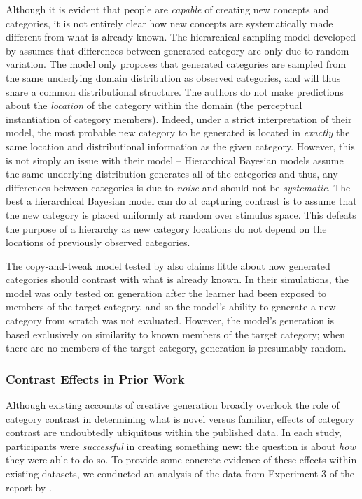 \documentclass[12pt]{article}
\begin{document}
\begin{flushleft}
Although it is evident that people are \textit{capable} of creating new concepts and categories, it is not entirely clear how new concepts are systematically made different from what is already known. The hierarchical sampling model developed by \cite{jern2013probabilistic} assumes that differences between generated category are only due to random variation. The model only proposes that generated categories are sampled from the same underlying domain distribution as observed categories, and will thus share a common distributional structure. The authors do not make predictions about the \textit{location} of the category within the domain (the perceptual instantiation of category members). Indeed, under a strict interpretation of their model, the most probable new category to be generated is located in {\em exactly} the same location and distributional information as the given category. However, this is not simply an issue with their model -- Hierarchical Bayesian models assume the same underlying distribution generates all of the categories and thus, any differences between categories is due to {\em noise} and should not be {\em systematic}. The best a hierarchical Bayesian model can do at capturing contrast is to assume that the new category is placed uniformly at random over stimulus space. This defeats the purpose of a hierarchy as new category locations do not depend on the locations of previously observed categories.

The copy-and-tweak model tested by \cite{jern2013probabilistic} also claims little about how generated categories should contrast with what is already known. In their simulations, the model was only tested on generation after the learner had been exposed to members of the target category, and so the model's ability to generate a new category from scratch was not evaluated. However, the model's generation is based exclusively on similarity to known members of the target category; when there are no members of the target category, generation is presumably random.

\subsubsection{Contrast Effects in Prior Work}

Although existing accounts of creative generation broadly overlook the role of category contrast in determining what is novel versus familiar, effects of category contrast are undoubtedly ubiquitous within the published data. In each study, participants were \textit{successful} in creating something new: the question is about \textit{how} they were able to do so. To provide some concrete evidence of these effects within existing datasets, we conducted an analysis of the data from Experiment 3 of the report by \cite{jern2013probabilistic}. 


\end{flushleft}
\end{document}
